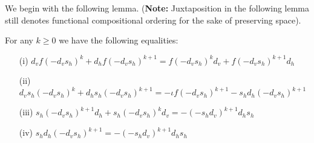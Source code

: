 We begin with the following lemma. (\textbf{Note:} Juxtaposition in the following lemma still denotes functional compositional ordering for the sake of preserving space).

\begin{lem}[label=lem:A3]
    For any $k \geq 0$ we have the following equalities:
    \begin{itemize}
        \item[(i)] $d_v f(-d_vs_h)^k+d_hf (-d_vs_h)^{k+1}=f(-d_vs_h)^kd_v + f (-d_vs_h)^{k+1}d_h$
        \item[(ii)] $d_vs_h(-d_vs_h)^k+d_hs_h(-d_vs_h)^{k+1} = -\iota f(-d_vs_h)^{k+1}-s_hd_h(-d_vs_h)^{k+1}$ 
        \item[(iii)] $s_h(-d_vs_h)^{k+1}d_h+s_h(-d_vs_h)^kd_v = -(-s_hd_v)^{k+1}d_hs_h$ 
        \item[(iv)] $s_hd_h(-d_vs_h)^{k+1} = -(-s_hd_v)^{k+1}d_hs_h$
    \end{itemize}
\end{lem}
